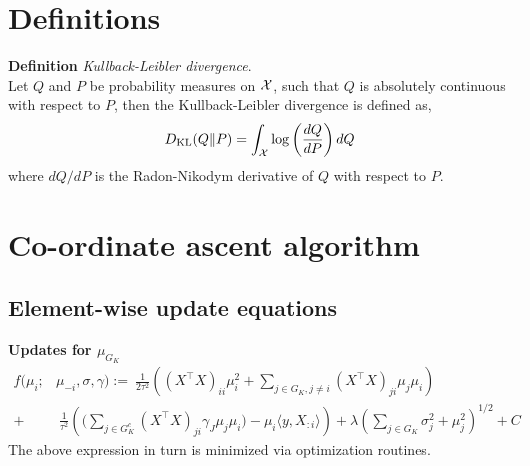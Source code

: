 \documentclass[12pt]{article}
\begin{document}
\newpage


\appendix
{}


\section{Definitions}
\textbf{Definition} \textit{Kullback-Leibler divergence}.\\ Let $Q$ and $P$ be probability measures on $\mathcal{X}$, such that $ Q $ is absolutely continuous with respect to $P$, then the Kullback-Leibler divergence is defined as,
\begin{equation}\label{eq:kl}
D_\text{KL}(Q \| P) = \int_{\mathcal{X}} \log \left( \frac{dQ}{dP} \right) dQ
\end{equation}
where $dQ/dP$ is the Radon-Nikodym derivative of $Q$ with respect to $P$.


\section{Co-ordinate ascent algorithm}

\subsection{Element-wise update equations}

\textbf{Updates for $\mu_{G_K}$}
\begin{equation} \label{eq:mu_update}
\begin{aligned}
    f(\mu_i; & \mu_{-i}, \sigma, \gamma) :=\
    \frac{1}{2\tau^2} \left(
	(X^\top X)_{ii} \mu_i^2 + 
	\sum_{j \in G_K, j\neq i} (X^\top X)_{ji} \mu_j \mu_i
    \right) \\
+ &\
    \frac{1}{\tau^2} \left(
	\bigg( \sum_{j \in G_K^c} (X^\top X)_{ji} \gamma_{J} \mu_j \mu_i \bigg) -
	\mu_i \langle y, X_{:i} \rangle   
    \right)
+
    \lambda \left( \sum_{j \in G_K} 
	\sigma_j^2 + \mu_j^2
    \right)^{1/2} + C
\end{aligned}
\end{equation}
The above expression in turn is minimized via optimization routines.
\end{document}
